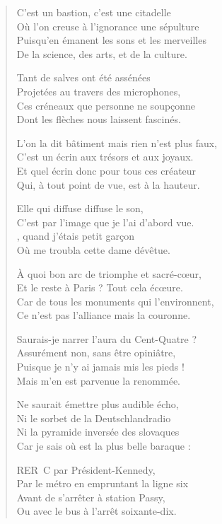 \begin{verse}
C’est un bastion, c’est une citadelle\\
Où l’on creuse à l’ignorance une sépulture\\
Puisqu’en émanent les sons et les merveilles\\
De la science, des arts, et de la culture.

Tant de salves ont été assénées\\
Projetées au travers des microphones,\\
Ces créneaux que personne ne soupçonne\\
Dont les flèches nous laissent fascinés.

L’on la dit bâtiment mais rien n’est plus faux,\\
C’est un écrin aux trésors et aux joyaux.\\
Et quel écrin donc pour tous ces créateur\\
Qui, à tout point de vue, est à la hauteur.

Elle qui diffuse diffuse le son,\\
C’est par l’image que je l’ai d’abord vue.\\
, quand j’étais petit garçon\\
Où me troubla cette dame dévêtue.

À quoi bon arc de triomphe et sacré-cœur,\\
Et le reste à Paris ? Tout cela écœure.\\
Car de tous les monuments qui l’environnent,\\
Ce n’est pas l’alliance mais la couronne.

Saurais-je narrer l’aura du Cent-Quatre ?\\
Assurément non, sans être opiniâtre,\\
Puisque je n’y ai jamais mis les pieds !\\
Mais m’en est parvenue la renommée.

Ne saurait émettre plus audible écho,\\
Ni le sorbet de la Deutschlandradio\\
Ni la pyramide inversée des slovaques\\
Car je sais où est la plus belle baraque :

RER~C  par Président-Kennedy,\\
Par le métro en empruntant la ligne six\\
Avant de s’arrêter à station Passy,\\
Ou avec le bus à l’arrêt soixante-dix.
\end{verse}


